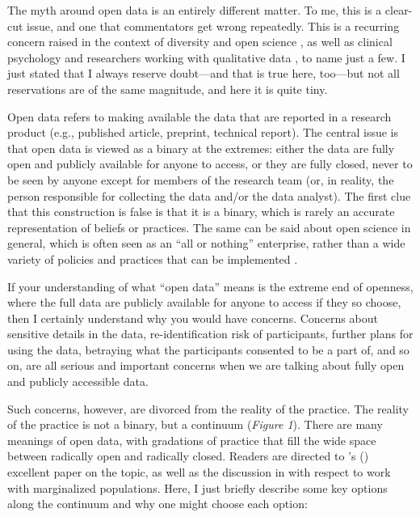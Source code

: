 \documentclass[authordate, empirical]{jote-new-article}
\begin{document}
The myth around open data is an entirely different matter. To me, this is a clear-cut issue, and one that commentators get wrong repeatedly. This is a recurring concern raised in the context of diversity and open science \parencites[e.g.,][]{FoxTree2022}{Grzanka2021}, as well as clinical psychology \parencites[see][]{Tackett2017} and researchers working with qualitative data \parencites[see][]{Field2021}, to name just a few. I just stated that I always reserve doubt—and that is true here, too—but not all reservations are of the same magnitude, and here it is quite tiny.







Open data refers to making available the data that are reported in a research product (e.g., published article, preprint, technical report). The central issue is that open data is viewed as a binary at the extremes: either the data are fully open and publicly available for anyone to access, or they are fully closed, never to be seen by anyone except for members of the research team (or, in reality, the person responsible for collecting the data and/or the data analyst). The first clue that this construction is false is that it is a binary, which is rarely an accurate representation of beliefs or practices. The same can be said about open science in general, which is often seen as an “all or nothing” enterprise, rather than a wide variety of policies and practices that can be implemented \parencites[see][]{Bergmann2023}{Kathawalla2021}{Silversteininpress}.







If your understanding of what “open data” means is the extreme end of openness, where the full data are publicly available for anyone to access if they so choose, then I certainly understand why you would have concerns. Concerns about sensitive details in the data, re-identification risk of participants, further plans for using the data, betraying what the participants consented to be a part of, and so on, are all serious and important concerns when we are talking about fully open and publicly accessible data.







Such concerns, however, are divorced from the reality of the practice. The reality of the practice is not a binary, but a continuum (\emph{Figure 1}). There are many meanings of open data, with gradations of practice that fill the wide space between radically open and radically closed. Readers are directed to \citeauthor{Meyer2018}'s (\citeyear{Meyer2018}) excellent paper on the topic, as well as the discussion in \textcite{Syed2022} with respect to work with marginalized populations. Here, I just briefly describe some key options along the continuum and why one might choose each option:
\end{document}
